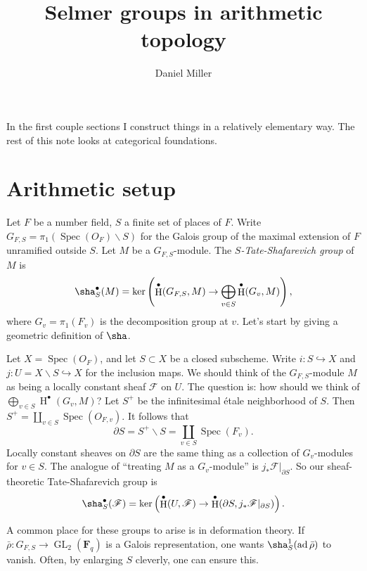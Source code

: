 \documentclass{amsart}
\title{Selmer groups in arithmetic topology}
\author{Daniel Miller}
\DeclareMathOperator{\adjoint}{ad}
\DeclareMathOperator{\GL}{GL}
\DeclareMathOperator{\h}{H}
\DeclareMathOperator{\spectrum}{Spec}
\newcommand{\dF}{\mathbf{F}}
\newcommand{\sF}{\mathscr{F}}
\begin{document}
\maketitle





In the first couple sections I construct things in a relatively elementary way. 
The rest of this note looks at categorical foundations. 





\section{Arithmetic setup}

Let $F$ be a number field, $S$ a finite set of places of $F$. Write 
$G_{F,S}=\pi_1(\spectrum(O_F)\smallsetminus S)$ for the Galois group of the 
maximal extension of $F$ unramified outside $S$. Let $M$ be a 
$G_{F,S}$-module. The \emph{$S$-Tate-Shafarevich group} of $M$ is 
\[
  \sha_S^\bullet(M) = \ker\left(\h^\bullet(G_{F,S},M) \to \bigoplus_{v\in S} \h^\bullet(G_v,M)\right) ,
\]
where $G_v=\pi_1(F_v)$ is the decomposition group at $v$. Let's start by giving 
a geometric definition of $\sha$. 

Let $X=\spectrum(O_F)$, and let $S\subset X$ be a closed subscheme. Write 
$i:S\hookrightarrow X$ and $j:U=X\smallsetminus S\hookrightarrow X$ for the 
inclusion maps. We should think of the $G_{F,S}$-module $M$ as being a locally 
constant sheaf $\sF$ on $U$. The question is: how should we think of 
$\bigoplus_{v\in S} \h^\bullet(G_v,M)$? Let $S^+$ be the infinitesimal \'etale 
neighborhood of $S$. Then $S^+=\coprod_{v\in S} \spectrum(O_{F,v})$. It follows 
that 
\[
  \partial S = S^+\smallsetminus S = \coprod_{v\in S} \spectrum(F_v) .
\]
Locally constant sheaves on $\partial S$ are the same thing as a collection of 
$G_v$-modules for $v\in S$. The analogue of ``treating $M$ as a $G_v$-module'' 
is $j_\ast \sF|_{\partial S}$. So our sheaf-theoretic Tate-Shafarevich group is 
\[
  \sha_S^\bullet(\sF) = \ker\left(\h^\bullet(U,\sF) \to \h^\bullet(\partial S,j_\ast \sF|_{\partial S})\right) .
\]

A common place for these groups to arise is in deformation theory. If 
$\bar\rho:G_{F,S}\to \GL_2(\dF_q)$ is a Galois representation, one wants 
$\sha_S^1(\adjoint \bar\rho)$ to vanish. Often, by enlarging $S$ cleverly, one 
can ensure this. 
\end{document}
